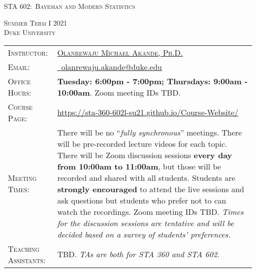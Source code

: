 \documentclass[11pt, a4paper]{article}
\begin{document}
\renewcommand{\arraystretch}{1.5}	


\begin{center}
{\Large \textsc{STA 602:\ Bayesian and Modern Statistics}}
\end{center}


\begin{center}
	\textsc{Summer Term I 2021} \\
	\textsc{Duke University} \\
\end{center}




\begin{center}
	\begin{minipage}[t]{.9\textwidth}
		\begin{tabular}{@{}L{3cm}L{12cm}}
			\toprule[0.065cm]
			\textsc{Instructor:} & \href{https://akandelanre.github.io.}{\textsc{Olanrewaju Michael Akande, Ph.D.}} \\
			\textsc{Email:} &\href{mailto:olanrewaju.akande@duke.edu}{\Envelope ~olanrewaju.akande@duke.edu} \\
			\textsc{Office Hours:} & \textbf{Tuesday: 6:00pm - 7:00pm; Thursdays: 9:00am - 10:00am}. Zoom meeting IDs TBD. \\
			\textsc{Course Page:} & \href{https://sta-360-602l-su21.github.io/Course-Website/}{https://sta-360-602l-su21.github.io/Course-Website/} \\
			\textsc{Meeting Times:} & There will be no ``\textit{fully synchronous}'' meetings. There will be pre-recorded lecture videos for each topic. There will be Zoom discussion sessions \textbf{every day from 10:00am to 11:00am}, but those will be recorded and shared with all students. Students are \textbf{strongly encouraged} to attend the live sessions and ask questions but students who prefer not to can watch the recordings. Zoom meeting IDs TBD. 
			\newline \textit{Times for the discussion sessions are tentative and will be decided based on a survey of students' preferences.} \\
			\textsc{Teaching Assistants:} & TBD.
			\newline \textit{TAs are both for STA 360 and STA 602.}\\ 

\end{tabular}
\end{minipage}
\end{center}
\end{document}
